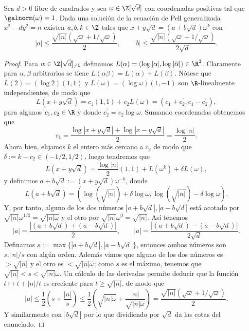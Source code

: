 \documentclass[teoria-numeros.tex]{subfiles}
\begin{document}
\begin{thm}
	Sea $d > 0$ libre de cuadrados y sea $\omega \in \Z[\sqrt{d}]$ con coordenadas positivas tal que $\galnorm(\omega) = 1$.
	Dada una solución de la ecuación de Pell generalizada $x^2 - dy^2 = n$ existen $a, b, k \in \Z$
	tales que $x + y\sqrt{d} = (a + b\sqrt{d})\omega^k$ con
	$$ |a| \le \frac{ \sqrt{|n|}(\sqrt{\omega} + 1/\sqrt{\omega}) }{2}, \qquad |b| \le \frac{ \sqrt{|n|}(\sqrt{\omega} + 1/\sqrt{\omega}) }{2\sqrt{d}}. $$
\end{thm}
\begin{proof}
	Para $\alpha \in \Z[\sqrt{d}]_{\ne 0}$ definamos $L(\alpha) = (\log|\alpha|, \log |\overline{\alpha}|) \in \R^2$.
	Claramente para $ \alpha, \beta$ arbitrarios se tiene $L(\alpha \beta) = L(\alpha) + L(\beta)$.
	Nótese que $L(2) = (\log 2)(1, 1)$ y $L(\omega) = (\log\omega) (1, -1)$ son $\R$-linealmente independientes, de modo que
	$$ L(x + y\sqrt{d}) = c_1 (1, 1) + c_2 L(\omega) = (c_1 + c_2^\prime, c_1 - c_2^\prime), $$
	para algunos $c_1, c_2 \in \R$ y donde $c_2^\prime = c_2\log \omega$.
	Sumando coordenadas obtenemos que
	$$ c_1 = \frac{\log|x + y\sqrt{d}| + \log|x - y\sqrt{d}|}{2} = \frac{\log|n|}{2}. $$
	Ahora bien, elijamos $k$ el entero más cercano a $c_2$ de modo que $\delta := k - c_2 \in (-1/2, 1/2)$, luego tendremos que
	$$ L(x + y\sqrt{d}) = \frac{\log|n|}{2}(1, 1) + L(\omega^k) + \delta L(\omega), $$
	y definimos $a + b\sqrt{d} := (x + y\sqrt{d}) \omega^{-k}$, donde
	$$ L(a + b\sqrt{d}) = ( \log( \sqrt{|n|} ) + \delta\log\omega, \log( \sqrt{|n|} ) - \delta\log\omega ). $$
	Y, por tanto, alguno de los dos números $|a + b\sqrt{d}|, |a - b\sqrt{d}|$ está acotado por $\sqrt{|n|}\omega^{1/2} = \sqrt{|n| \omega}$
	y el otro por $\sqrt{|n|} \omega^0 = \sqrt{|n|}$.
	Así tenemos
	$$ |a| = \frac{|(a + b\sqrt{d}) + (a - b\sqrt{d})|}{2}, \qquad |a| = \frac{|(a + b\sqrt{d}) - (a - b\sqrt{d})|}{2\sqrt{d}}. $$
	Definamos $s := \max\{ |a + b\sqrt{d}|, |a - b\sqrt{d}| \}$, entonces ambos números son $s, |n|/s$ con algún orden.
	Además vimos que alguno de los dos números es $> \sqrt{|n|}$ y el otro es $< \sqrt{|n| \omega}$; como $s$ es el máximo,
	tenemos que $\sqrt{|n|} < s < \sqrt{|n|}\omega$.
	Un cálculo de las derivadas permite deducir que la función $t \mapsto t + |n|/t$ es creciente para $t \ge \sqrt{|n|}$, de modo que
	$$ |a| \le \frac{1}{2}\left( s + \frac{|n|}{s} \right) \le \frac{1}{2}\left( \sqrt{|n| \omega} + \frac{|n|}{\sqrt{|n| \omega}} \right)
	= \frac{\sqrt{|n|}( \sqrt{\omega} + 1/\sqrt{\omega} )}{2}. $$
	Y similarmente con $|b \sqrt{d}|$ por lo que dividiendo por $\sqrt{d}$ da las cotas del enunciado.
\end{proof}
\end{document}
